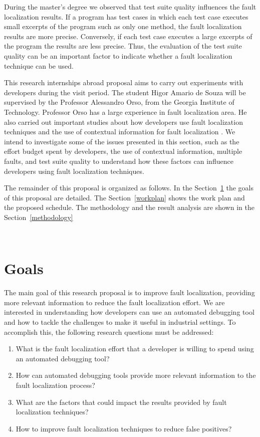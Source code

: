 \documentclass[12pt,a4paper,espaco=umemeio,noindentfirst,oneside,openany,tocpage=plain,pnumromarab,ruledheader,time,anapcustomindent]{sty/abnt}
\begin{document}
During the master's degree \cite{souza2012b} we observed that test suite quality influences the fault localization results. If a program has test cases 
in which each test case executes small excerpts of the program such as only one method, the fault localization results are more precise. Conversely, if 
each test case executes a large excerpts of the program the results are less precise. Thus, the evaluation of the test suite quality can be an important 
factor to indicate whether a fault localization technique can be used. 

This research internships abroad proposal aims to carry out experiments with developers during the visit period. The student Higor Amario de Souza will 
be supervised by the Professor Alessandro Orso, from the Georgia Institute of Technology. Professor Orso has a large experience in fault localization 
area. He also carried out important studies about how developers use fault localization techniques \cite{parnin2011} and the use of contextual information 
for fault localization \cite{hsu2008}. We intend to investigate some of the issues presented in this section, such as the effort budget spent by 
developers, the use of contextual information, multiple faults, and test suite quality to understand how these factors can influence developers using 
fault localization techniques.

The remainder of this proposal is organized as follows. In the Section~\ref{goals} the goals of this proposal are detailed.
The Section~\ref{workplan} shows the work plan and the proposed schedule. The methodology and the result analysis are shown in the 
Section~\ref{methodology}

\
\section{Goals}
\label{goals}

The main goal of this research proposal is to improve fault localization, providing more relevant information to reduce the fault localization effort. 
We are interested in understanding how developers can use an automated debugging tool and how to tackle the challenges to make it useful 
in industrial settings. To accomplish this, the following research questions must be addressed:

\begin{enumerate}
 \item What is the fault localization effort that a developer is willing to spend using an automated debugging tool?
 \item How can automated debugging tools provide more relevant information to the fault localization process?
 \item What are the factors that could impact the results provided by fault localization techniques?
 \item How to improve fault localization techniques to reduce false positives?
\end{enumerate}
\end{document}
